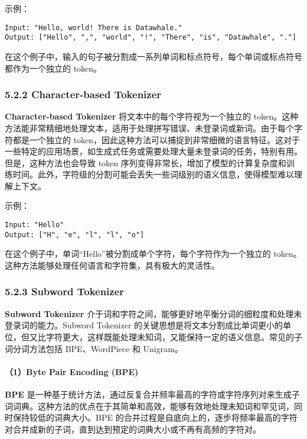 \documentclass[
]{article}
\begin{document}
示例：

\begin{verbatim}
Input: "Hello, world! There is Datawhale."
Output: ["Hello", ",", "world", "!", "There", "is", "Datawhale", "."]
\end{verbatim}

在这个例子中，输入的句子被分割成一系列单词和标点符号，每个单词或标点符号都作为一个独立的
token。

\subsubsection{5.2.2 Character-based
Tokenizer}\label{character-based-tokenizer}

\textbf{Character-based Tokenizer} 将文本中的每个字符视为一个独立的
token。这种方法能非常精细地处理文本，适用于处理拼写错误、未登录词或新词。由于每个字符都是一个独立的
token，因此这种方法可以捕捉到非常细微的语言特征。这对于一些特定的应用场景，如生成式任务或需要处理大量未登录词的任务，特别有用。但是，这种方法也会导致
token
序列变得非常长，增加了模型的计算复杂度和训练时间。此外，字符级的分割可能会丢失一些词级别的语义信息，使得模型难以理解上下文。

示例：

\begin{verbatim}
Input: "Hello"
Output: ["H", "e", "l", "l", "o"]
\end{verbatim}

在这个例子中，单词``Hello''被分割成单个字符，每个字符作为一个独立的
token。这种方法能够处理任何语言和字符集，具有极大的灵活性。

\subsubsection{5.2.3 Subword Tokenizer}\label{subword-tokenizer}

\textbf{Subword Tokenizer}
介于词和字符之间，能够更好地平衡分词的细粒度和处理未登录词的能力。Subword
Tokenizer
的关键思想是将文本分割成比单词更小的单位，但又比字符更大，这样既能处理未知词，又能保持一定的语义信息。常见的子词分词方法包括
BPE、WordPiece 和 Unigram。

\paragraph{（1）Byte Pair Encoding (BPE)}\label{byte-pair-encoding-bpe}

\textbf{BPE}
是一种基于统计方法，通过反复合并频率最高的字符或字符序列对来生成子词词典。这种方法的优点在于其简单和高效，能够有效地处理未知词和罕见词，同时保持较低的词典大小。BPE
的合并过程是自底向上的，逐步将频率最高的字符对合并成新的子词，直到达到预定的词典大小或不再有高频的字符对。
\end{document}
